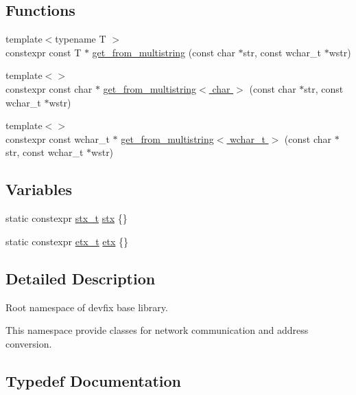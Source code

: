 \subsection*{Functions}
\begin{DoxyCompactItemize}
\item 
{\footnotesize template$<$typename T $>$ }\\constexpr const T $\ast$ \hyperlink{namespacedevfix_1_1base_a84282bc5458412dfed5ce8b039a70519}{get\+\_\+from\+\_\+multistring} (const char $\ast$str, const wchar\+\_\+t $\ast$wstr)
\item 
{\footnotesize template$<$$>$ }\\constexpr const char $\ast$ \hyperlink{namespacedevfix_1_1base_a1d6f6a1a767fa54cd6ff94ae14b43e90}{get\+\_\+from\+\_\+multistring$<$ char $>$} (const char $\ast$str, const wchar\+\_\+t $\ast$wstr)
\item 
{\footnotesize template$<$$>$ }\\constexpr const wchar\+\_\+t $\ast$ \hyperlink{namespacedevfix_1_1base_a100ea64654a747f262206d9e4b31e6f2}{get\+\_\+from\+\_\+multistring$<$ wchar\+\_\+t $>$} (const char $\ast$str, const wchar\+\_\+t $\ast$wstr)
\end{DoxyCompactItemize}
\subsection*{Variables}
\begin{DoxyCompactItemize}
\item 
static constexpr \hyperlink{structdevfix_1_1base_1_1stx__t}{stx\+\_\+t} \hyperlink{namespacedevfix_1_1base_af808feea9b7c85902ead58a187f6cced}{stx} \{\}
\item 
static constexpr \hyperlink{structdevfix_1_1base_1_1etx__t}{etx\+\_\+t} \hyperlink{namespacedevfix_1_1base_a875309a22b6e69dd0e2340814fb44973}{etx} \{\}
\end{DoxyCompactItemize}


\subsection{Detailed Description}
Root namespace of devfix base library. 

This namespace provide classes for network communication and address conversion. 

\subsection{Typedef Documentation}
\mbox{\label{namespacedevfix_1_1base_ad239a07977b9e77ffabaf558636d0b8b}} 
